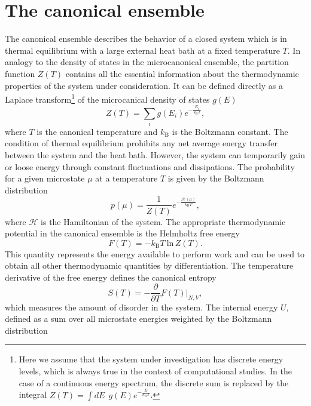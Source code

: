 \documentclass[12pt]{report}
\begin{document}
\section{The canonical ensemble}
\label{sec:canonicalEnsemble}
The canonical ensemble describes the behavior of a closed system which is in thermal equilibrium with a large external heat bath at a fixed temperature $T$. In analogy to the density of states in the microcanonical ensemble, the partition function $Z(T)$ contains all the essential information about the thermodynamic properties of the system under consideration\cite{Landau2000}. It can be defined directly as a Laplace transform\footnote{Here we assume that the system under investigation has discrete energy levels, which is always true in the context of computational studies. In the case of a continuous energy spectrum, the discrete sum is replaced by the integral $Z(T) = \int dE \:\:  g(E) e^{-\frac{E}{k_{\mathrm{B}}T}}$.} of the microcanical density of states $g(E)$
\begin{equation}
Z(T) = \sum_{i} g(E_{i}) e^{-\frac{E_{i}}{k_{\mathrm{B}}T}},
\end{equation}
where $T$ is the canonical temperature and $k_{\mathrm{B}}$ is the Boltzmann constant. The condition of thermal equilibrium prohibits any net average energy transfer between the system and the heat bath. However, the system can temporarily gain or loose energy through constant fluctuations and dissipations. The probability for a given microstate $\mu$ at a temperature $T$ is given by the Boltzmann distribution
\begin{equation}
p(\mu) = \frac{1}{Z(T)}e^{-\frac{\mathcal{H}(\mu)}{k_{\mathrm{B}}T}},
\end{equation}
where $\mathcal{H}$ is the Hamiltonian of the system. The appropriate thermodynamic potential in the canonical ensemble is the Helmholtz free energy
\begin{equation}
F(T) = -k_{\mathrm{B}}T \: \mathrm{ln}\, Z(T).
\end{equation}
This quantity represents the energy available to perform work and can be used to obtain all other thermodynamic quantities by differentiation\cite{Pathria,Sethna2006}. The temperature derivative of the free energy defines the canonical entropy
\begin{equation}
\label{eq:canonicalEntropy}
S(T) = -\frac{\partial}{\partial T}F(T)\bigg|_{N,V},
\end{equation} 
which measures the amount of disorder in the system.
The internal energy $U$, defined as a sum over all microstate energies weighted by the Boltzmann distribution  
\end{document}

